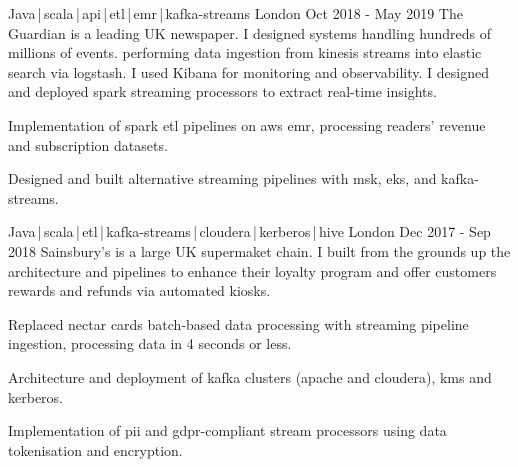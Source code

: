 \begin{cventries}
    \cventry
    {Java\,|\,scala\,|\,api\,|\,etl\,|\,emr\,|\,kafka-streams}
    {} 
    {London}
    {Oct 2018 - May 2019}
    {The Guardian is a leading UK newspaper. I designed systems handling hundreds of millions of events. performing data ingestion from kinesis streams into elastic search via logstash. I used Kibana for monitoring and observability. I designed and deployed spark streaming processors to extract real-time insights.}
    {
        \begin{cvitems}
            \item{Implementation of spark etl pipelines on aws emr, processing readers' revenue and subscription datasets.}
            \item{Designed and built alternative streaming pipelines with msk, eks, and kafka-streams.}
        \end{cvitems}
    }

    \cventry
    {Java\,|\,scala\,|\,etl\,|\,kafka-streams\,|\,cloudera\,|\,kerberos\,|\,hive}
    {} 
    {London}
    {Dec 2017 - Sep 2018}
    {Sainsbury's is a large UK supermaket chain. I built from the grounds up the architecture and pipelines to enhance their loyalty program and offer customers rewards and refunds via automated kiosks.}
    {
        \begin{cvitems}
            \item{Replaced nectar cards batch-based data processing with streaming pipeline ingestion, processing data in 4 seconds or less.}
            \item{Architecture and deployment of kafka clusters (apache and cloudera), kms and kerberos.}
            \item{Implementation of pii and gdpr-compliant stream processors using data tokenisation and encryption.}
        \end{cvitems}
    }


\end{cventries}
